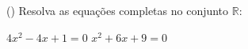 \begin{question} () %
 Resolva as equações completas no conjunto $\mathbb{R}$:
\begin{tasks}
        \task $4x^2-4x+1=0$
        \task $x^2+6x+9=0$
    \end{tasks}
\end{question}
